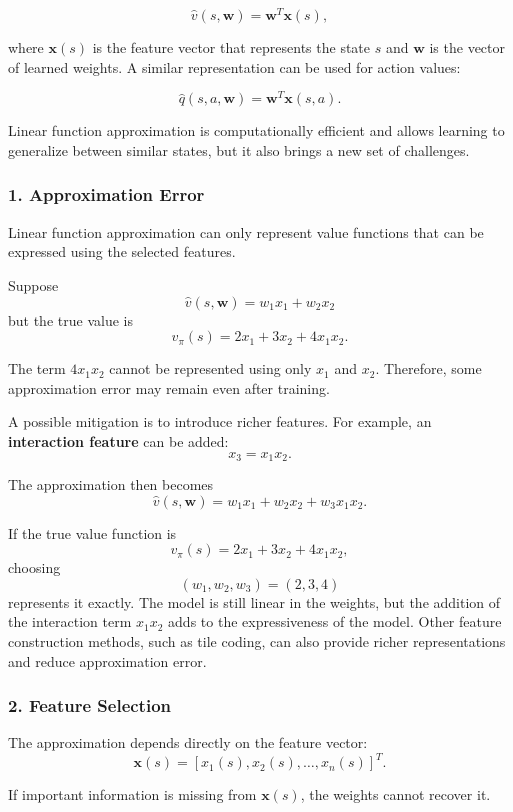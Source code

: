 \documentclass{scrartcl}
\theoremstyle{mytheoremstyle}
\theoremstyle{mytheoremstyle}
\theoremstyle{myproblemstyle}
\begin{document}
\[
    \hat{v}(s,\mathbf{w})=\mathbf{w}^T\mathbf{x}(s),
\]

where $\mathbf{x}(s)$ is the feature vector that represents the state $s$ and $\mathbf{w}$ is the vector of learned weights. A similar representation can be used for action values:

\[
    \hat{q}(s,a,\mathbf{w})=\mathbf{w}^T\mathbf{x}(s,a).
\]

Linear function approximation is computationally efficient and allows learning to generalize between similar states, but it also brings a new set of challenges.

\subsubsection*{1. Approximation Error}

Linear function approximation can only represent value functions that can be expressed using the selected features.

Suppose
\[
    \hat v(s,\mathbf w)=w_1x_1+w_2x_2
\]
but the true value is
\[
    v_\pi(s)=2x_1+3x_2+4x_1x_2.
\]

The term $4x_1x_2$ cannot be represented using only $x_1$ and $x_2$. Therefore, some approximation error may remain even after training.

A possible mitigation is to introduce richer features. For example, an \textbf{interaction feature} can be added:
\[
    x_3=x_1x_2.
\]

The approximation then becomes
\[
    \hat v(s,\mathbf w)
    =w_1x_1+w_2x_2+w_3x_1x_2.
\]

If the true value function is
\[
    v_\pi(s)=2x_1+3x_2+4x_1x_2,
\]
choosing
\[
    (w_1,w_2,w_3)=(2,3,4)
\]
represents it exactly. The model is still linear in the weights, but the addition of the interaction term $x_1x_2$ adds to the expressiveness of the model. Other feature construction methods, such as tile coding, can also provide richer representations and reduce approximation error.

\subsubsection*{2. Feature Selection}

The approximation depends directly on the feature vector:
\[
    \mathbf{x}(s) =
    [x_1(s),x_2(s),\ldots,x_n(s)]^T.
\]

If important information is missing from $\mathbf{x}(s)$, the weights cannot recover it.
\end{document}
